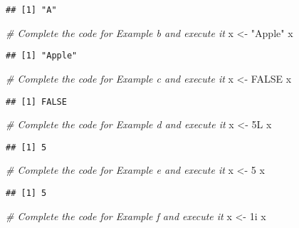 \documentclass[
]{article}
\newenvironment{Shaded}{\begin{snugshade}}{\end{snugshade}}
\newcommand{\CommentTok}[1]{\textcolor[rgb]{0.56,0.35,0.01}{\textit{#1}}}
\newcommand{\ConstantTok}[1]{\textcolor[rgb]{0.56,0.35,0.01}{#1}}
\newcommand{\DecValTok}[1]{\textcolor[rgb]{0.00,0.00,0.81}{#1}}
\newcommand{\NormalTok}[1]{#1}
\newcommand{\OtherTok}[1]{\textcolor[rgb]{0.56,0.35,0.01}{#1}}
\newcommand{\StringTok}[1]{\textcolor[rgb]{0.31,0.60,0.02}{#1}}
\begin{document}
\begin{verbatim}
## [1] "A"
\end{verbatim}

\begin{Shaded}
\begin{Highlighting}[]
\CommentTok{\# Complete the code for Example b and execute it}
\NormalTok{x }\OtherTok{\textless{}{-}} \StringTok{"Apple"}
\NormalTok{x}
\end{Highlighting}
\end{Shaded}

\begin{verbatim}
## [1] "Apple"
\end{verbatim}

\begin{Shaded}
\begin{Highlighting}[]
\CommentTok{\# Complete the code for Example c and execute it}
\NormalTok{x }\OtherTok{\textless{}{-}} \ConstantTok{FALSE}
\NormalTok{x}
\end{Highlighting}
\end{Shaded}

\begin{verbatim}
## [1] FALSE
\end{verbatim}

\begin{Shaded}
\begin{Highlighting}[]
\CommentTok{\# Complete the code for Example d and execute it}
\NormalTok{x }\OtherTok{\textless{}{-}}\NormalTok{ 5L}
\NormalTok{x}
\end{Highlighting}
\end{Shaded}

\begin{verbatim}
## [1] 5
\end{verbatim}

\begin{Shaded}
\begin{Highlighting}[]
\CommentTok{\# Complete the code for Example e and execute it}
\NormalTok{x }\OtherTok{\textless{}{-}} \DecValTok{5}
\NormalTok{x}
\end{Highlighting}
\end{Shaded}

\begin{verbatim}
## [1] 5
\end{verbatim}

\begin{Shaded}
\begin{Highlighting}[]
\CommentTok{\# Complete the code for Example f and execute it}
\NormalTok{x }\OtherTok{\textless{}{-}}\NormalTok{ 1i}
\NormalTok{x}
\end{Highlighting}
\end{Shaded}
\end{document}
